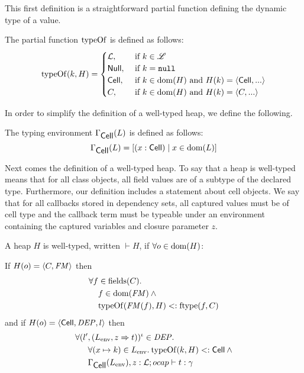 This first definition is a straightforward partial function defining the dynamic
type of a value.
\begin{definition}
  The partial function $\mbox{$\mathrm{typeOf}$}$ is defined as follows:
  \begin{equation}
    \mbox{$\mathrm{typeOf}$}{(k, H)} =
    \begin{cases}
      \mbox{$\mathcal{L}$}, &\text{ if }k \in \mbox{$\mathscr{L}$} \\
      \mbox{$\mathsf{Null}$}, &\text{ if }k = \mbox{\mdseries\texttt{null}} \\
      \mbox{$\mathsf{Cell}$}, &\text{ if }k \in \mbox{$\mathrm{dom}$}{(H)}\text{ and } H(k) = \mbox{$\langle \mbox{$\mathsf{Cell}$}{}, ... \rangle$} \\
      C, &\text{ if }k \in \mbox{$\mathrm{dom}$}{(H)}\text{ and } H(k) = \mbox{$\langle C, ... \rangle$} \\
    \end{cases}
  \end{equation}
\end{definition}
In order to simplify the definition of a well-typed heap, we define the
following.
\begin{definition}
  The typing environment $\Gamma_{\mbox{$\mathsf{Cell}$}}(L)$ is defined as follows:
  \begin{equation}
    \Gamma_{\mbox{$\mathsf{Cell}$}}(L) = \left[(x: \mbox{$\mathsf{Cell}$}) \mid x \in \mbox{$\mathrm{dom}$}(L)\right]
  \end{equation}
\end{definition}
Next comes the definition of a well-typed heap. To say that a heap is
well-typed means that for all class objects, all field values are of
a subtype of the declared type. Furthermore, our definition includes a statement
about cell objects. We say that for all callbacks stored in dependency sets, all
captured values must be of cell type and the callback term must be typeable
under an environment containing the captured variables and closure parameter
$z$.
\begin{definition}
  A heap $H$ is well-typed, written $\vdash{H}$, if
  $\forall o \in \mbox{$\mathrm{dom}$}{(H)}$:

  If $H(o) = \mbox{$\langle C, \mathit{FM} \rangle$}$ then
  \begin{equation} \label{eq:defwth1}
    \begin{aligned}
      \forall f &\in \mbox{$\mathrm{fields}$}{(C)}. \\ 
      &f \in \mbox{$\mathrm{dom}$}{(\ensuremath{\mathit{FM}})} \: \land \\ 
      &\mbox{$\mathrm{typeOf}$}{(\ensuremath{\mathit{FM}}(f), H)} <: \mbox{$\mathrm{ftype}$}{(f, C)}
    \end{aligned}
  \end{equation}
  and if $H(o) = \mbox{$\langle \mbox{$\mathsf{Cell}$}{}, \mathit{DEP}, l \rangle$}$ then
  \begin{equation} \label{eq:defwth2}
    \begin{aligned}
      \forall (l'&, (L_{\text{env}}, z \Rightarrow t))^\iota \in \mathit{DEP}. \\
      &\forall (x \mapsto k) \in L_{\text{env}}.\: \mbox{$\mathrm{typeOf}$}{(k, H)} <:
      \mbox{$\mathsf{Cell}$} \: \land \\
      &\mbox{$\Gamma_{\mbox{$\mathsf{Cell}$}{}}(L_{\text{env}}), z:
      \mbox{$\mathcal{L}$};\mbox{$ocap$}\vdash t:\gamma$} 
    \end{aligned}
  \end{equation}
\end{definition}

